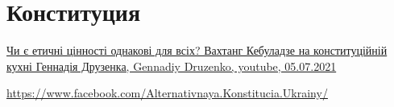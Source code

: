  
 
 
 
 
\chapter{Конституция}

\href{https://www.youtube.com/watch?v=3--6UQ-LR8E}{%
Чи є етичні цінності однакові для всіх? Вахтанг Кебуладзе на конституційній кухні Геннадія Друзенка, %
Gennadiy Druzenko, youtube, 05.07.2021%
}

\url{https://www.facebook.com/Alternativnaya.Konstitucia.Ukrainy/}
